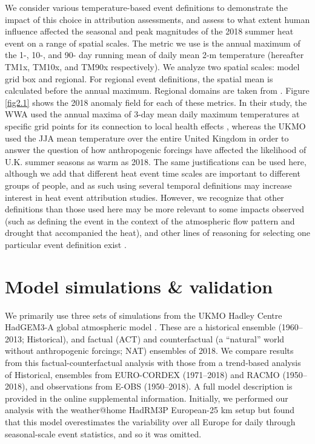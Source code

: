   We consider various temperature-based event definitions to demonstrate the impact of this choice in attribution assessments, and assess to what extent human influence affected the seasonal and peak magnitudes of the 2018 summer heat event on a range of spatial scales. The metric we use is the annual maximum of the 1-, 10-, and 90- day running mean of daily mean 2-m temperature (hereafter TM1x, TM10x, and TM90x respectively). We analyze two spatial scales: model grid box and regional. For regional event definitions, the spatial mean is calculated before the annual maximum. Regional domains are taken from \citet{christensen_summary_2007}. Figure \ref{fig2.1} shows the 2018 anomaly field for each of these metrics. In their study, the WWA used the annual maxima of 3-day mean daily maximum temperatures at specific grid points for its connection to local health effects \citep{dippoliti_impact_2010}, whereas the UKMO used the JJA mean temperature over the entire United Kingdom in order to answer the question of how anthropogenic forcings have affected the likelihood of U.K. summer seasons as warm as 2018. The same justifications can be used here, although we add that different heat event time scales are important to different groups of people, and as such using several temporal definitions may increase interest in heat event attribution studies. However, we recognize that other definitions than those used here may be more relevant to some impacts observed (such as defining the event in the context of the atmospheric flow pattern and drought that accompanied the heat), and other lines of reasoning for selecting one particular event definition exist \citep{cattiaux_defining_2018}.

\section{Model simulations \& validation}

  We primarily use three sets of simulations from the UKMO Hadley Centre HadGEM3-A global atmospheric model \citep{christidis_new_2013,ciavarella_upgrade_2018}. These are a historical ensemble (1960--2013; Historical), and factual (ACT) and counterfactual (a “natural” world without anthropogenic forcings; NAT) ensembles of 2018. We compare results from this factual-counterfactual analysis with those from a trend-based analysis of Historical, ensembles from EURO-CORDEX \citep{vautard_simulation_2013,jacob_euro-cordex_2014,vrac_influence_2017} (1971--2018) and RACMO \citep{aalbers_local-scale_2018,lenderink_preparing_2014} (1950--2018), and observations from E-OBS (1950--2018). A full model description is provided in the online supplemental information. Initially, we performed our analysis with the weather@home HadRM3P European-25 km setup \citep{massey_weatherhome-development_2015} but found that this model overestimates the variability over all Europe for daily through seasonal-scale event statistics, and so it was omitted.

